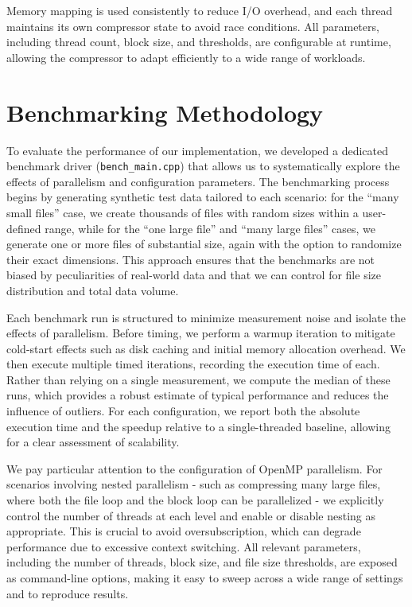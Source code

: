 \documentclass[10pt]{article}
\begin{document}
Memory mapping is used consistently to reduce I/O overhead, and each thread maintains its own compressor state to avoid race conditions. All parameters, including thread count, block size, and thresholds, are configurable at runtime, allowing the compressor to adapt efficiently to a wide range of workloads.

\section{Benchmarking Methodology}
To evaluate the performance of our implementation, we developed a dedicated benchmark driver (\texttt{bench\_main.cpp}) that allows us to systematically explore the effects of parallelism and configuration parameters. The benchmarking process begins by generating synthetic test data tailored to each scenario: for the “many small files” case, we create thousands of files with random sizes within a user-defined range, while for the “one large file” and “many large files” cases, we generate one or more files of substantial size, again with the option to randomize their exact dimensions. This approach ensures that the benchmarks are not biased by peculiarities of real-world data and that we can control for file size distribution and total data volume.

Each benchmark run is structured to minimize measurement noise and isolate the effects of parallelism. Before timing, we perform a warmup iteration to mitigate cold-start effects such as disk caching and initial memory allocation overhead. We then execute multiple timed iterations, recording the execution time of each. Rather than relying on a single measurement, we compute the median of these runs, which provides a robust estimate of typical performance and reduces the influence of outliers. For each configuration, we report both the absolute execution time and the speedup relative to a single-threaded baseline, allowing for a clear assessment of scalability.

We pay particular attention to the configuration of OpenMP parallelism. For scenarios involving nested parallelism - such as compressing many large files, where both the file loop and the block loop can be parallelized - we explicitly control the number of threads at each level and enable or disable nesting as appropriate. This is crucial to avoid oversubscription, which can degrade performance due to excessive context switching. All relevant parameters, including the number of threads, block size, and file size thresholds, are exposed as command-line options, making it easy to sweep across a wide range of settings and to reproduce results.
\end{document}
